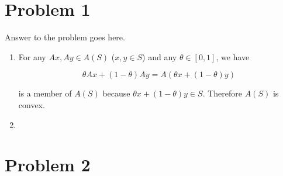 \documentclass[12pt,letterpaper]{article}
\begin{document}
\section*{Problem 1}

Answer to the problem goes here.

\begin{enumerate}
    \item
        For any $Ax, Ay \in A(S)$ ($x, y \in S$) and any $\theta \in [0, 1]$, we have

        \[\theta Ax + (1 - \theta) Ay = A (\theta x + (1- \theta)y)\]

        is a member of $A(S)$ because $\theta x + (1-\theta) y \in S$.
        Therefore $A(S)$ is convex.


    \item

\end{enumerate}

%
%
%
%     
%    
%     
%


\section*{Problem 2}
\end{document}
